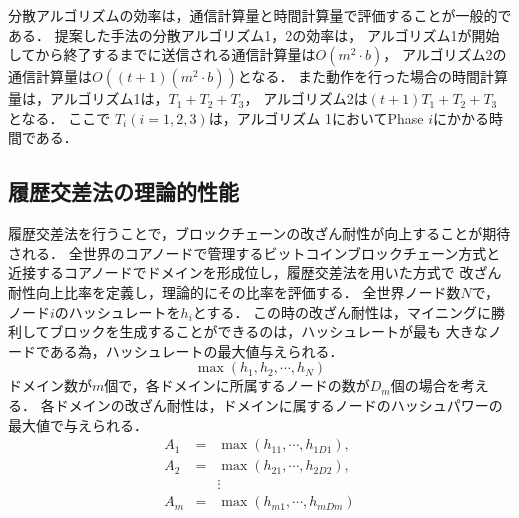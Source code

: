 \documentclass[a4paper,12pt]{jsarticle}
\begin{document}
分散アルゴリズムの効率は，通信計算量と時間計算量で評価することが一般的である．
提案した手法の分散アルゴリズム1，2の効率は，
アルゴリズム1が開始してから終了するまでに送信される通信計算量は$O(m^2 \cdot b)$，
アルゴリズム2の通信計算量は$O((t+1)(m^2 \cdot b))$となる．
また動作を行った場合の時間計算量は，アルゴリズム1は，$ T_1 + T_2 + T_3 $，
アルゴリズム2は$ ( t + 1 ) T_1 + T_2 + T_3 $ となる．
ここで $T_i (i=1, 2, 3)$は，アルゴリズム 1においてPhase $i$にかかる時間である．

\subsection{履歴交差法の理論的性能}

履歴交差法を行うことで，ブロックチェーンの改ざん耐性が向上することが期待される．
全世界のコアノードで管理するビットコインブロックチェーン方式と
近接するコアノードでドメインを形成位し，履歴交差法を用いた方式で
改ざん耐性向上比率を定義し，理論的にその比率を評価する．
全世界ノード数$N$で，ノード$i$のハッシュレートを$h_i$とする．
この時の改ざん耐性は，マイニングに勝利してブロックを生成することができるのは，ハッシュレートが最も
大きなノードである為，ハッシュレートの最大値与えられる．
%
\begin{equation}
  \max(h_1, h_2, \cdots, h_N)
\end{equation}
%
ドメイン数が$m$個で，各ドメインに所属するノードの数が$D_m$個の場合を考える．
各ドメインの改ざん耐性は，ドメインに属するノードのハッシュパワーの最大値で与えられる．
%
\begin{eqnarray}
	A_1 &=& \max (h_{11}, \cdots ,h_{1D1}), \\
	A_2 &=& \max(h_{21}, \cdots ,h_{2D2}), \\
	    & & \vdots \nonumber \\
	A_m &=& \max(h_{m1}, \cdots ,h_{mDm})
\end{eqnarray}
%
\end{document}
